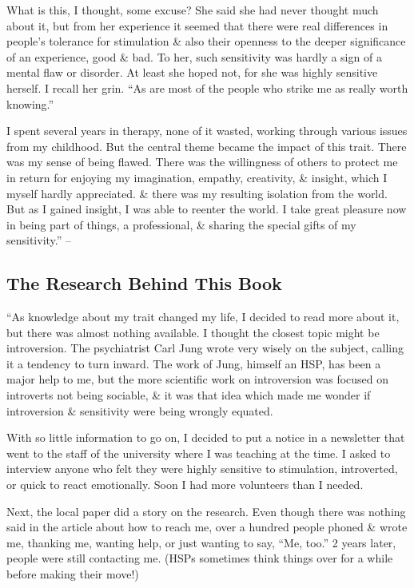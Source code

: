 \documentclass{article}
\numberwithin{equation}{section}
\begin{document}
What is this, I thought, some excuse? She said she had never thought much about it, but from her experience it seemed that there were real differences in people's tolerance for stimulation \& also their openness to the deeper significance of an experience, good \& bad. To her, such sensitivity was hardly a sign of a mental flaw or disorder. At least she hoped not, for she was highly sensitive herself. I recall her grin. ``As are most of the people who strike me as really worth knowing.''

I spent several years in therapy, none of it wasted, working through various issues from my childhood. But the central theme became the impact of this trait. There was my sense of being flawed. There was the willingness of others to protect me in return for enjoying my imagination, empathy, creativity, \& insight, which I myself hardly appreciated. \& there was my resulting isolation from the world. But as I gained insight, I was able to reenter the world. I take great pleasure now in being part of things, a professional, \& sharing the special gifts of my sensitivity.'' -- \cite[pp. 31--33]{Aron2013}

\subsection*{The Research Behind This Book}
``As knowledge about my trait changed my life, I decided to read more about it, but there was almost nothing available. I thought the closest topic might be introversion. The psychiatrist Carl Jung wrote very wisely on the subject, calling it a tendency to turn inward. The work of Jung, himself an HSP, has been a major help to me, but the more scientific work on introversion was focused on introverts not being sociable, \& it was that idea which made me wonder if introversion \& sensitivity were being wrongly equated.

With so little information to go on, I decided to put a notice in a newsletter that went to the staff of the university where I was teaching at the time. I asked to interview anyone who felt they were highly sensitive to stimulation, introverted, or quick to react emotionally. Soon I had more volunteers than I needed.

Next, the local paper did a story on the research. Even though there was nothing said in the article about how to reach me, over a hundred people phoned \& wrote me, thanking me, wanting help, or just wanting to say, ``Me, too.'' 2 years later, people were still contacting me. (HSPs sometimes think things over for a while before making their move!)
\end{document}
